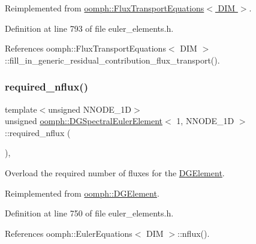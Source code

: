 Reimplemented from \hyperlink{classoomph_1_1FluxTransportEquations_a6994eab818eb7236e24e45b6fedec1f7}{oomph\+::\+Flux\+Transport\+Equations$<$ D\+I\+M $>$}.



Definition at line 793 of file euler\+\_\+elements.\+h.



References oomph\+::\+Flux\+Transport\+Equations$<$ D\+I\+M $>$\+::fill\+\_\+in\+\_\+generic\+\_\+residual\+\_\+contribution\+\_\+flux\+\_\+transport().

\mbox{\label{classoomph_1_1DGSpectralEulerElement_3_011_00_01NNODE__1D_01_4_a8a7b3f093854cccf1cc12f1f9d381a54}} 
\subsubsection{\texorpdfstring{required\+\_\+nflux()}{required\_nflux()}}
{\footnotesize\ttfamily template$<$unsigned N\+N\+O\+D\+E\+\_\+1D$>$ \\
unsigned \hyperlink{classoomph_1_1DGSpectralEulerElement}{oomph\+::\+D\+G\+Spectral\+Euler\+Element}$<$ 1, N\+N\+O\+D\+E\+\_\+1D $>$\+::required\+\_\+nflux (\begin{DoxyParamCaption}{ }\end{DoxyParamCaption})\hspace{0.3cm}{\ttfamily [inline]}, {\ttfamily [virtual]}}



Overload the required number of fluxes for the \hyperlink{classoomph_1_1DGElement}{D\+G\+Element}. 



Reimplemented from \hyperlink{classoomph_1_1DGElement_a87dc9f5b40437c3ab22db35229012c07}{oomph\+::\+D\+G\+Element}.



Definition at line 750 of file euler\+\_\+elements.\+h.



References oomph\+::\+Euler\+Equations$<$ D\+I\+M $>$\+::nflux().



